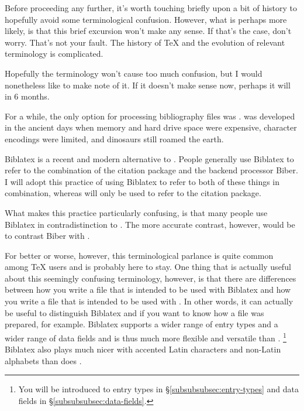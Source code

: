 \label{subsubsubsec:a-terminological-note}

Before proceeding any further, it's worth touching briefly upon a bit of history to hopefully avoid some terminological confusion.
However, what is perhaps more likely, is that this brief excursion won't make any sense.
If that's the case, don't worry.
That's not your fault.
The history of \TeX{} and the evolution of relevant terminology is complicated.

Hopefully the terminology won't cause too much confusion, but I would nonetheless like to make note of it.
If it doesn't make sense now, perhaps it will in 6 months.

For a while, the only option for processing bibliography files was .
 was developed in the ancient days when memory and hard drive space were expensive, character encodings were limited, and dinosaurs still roamed the earth.

Biblatex is a recent and modern alternative to .
People generally use Biblatex to refer to the combination of the citation package  and the backend processor Biber.
I will adopt this practice of using Biblatex to refer to both of these things in combination, whereas  will only be used to refer to the citation package.

What makes this practice particularly confusing, is that many people use Biblatex in contradistinction to .
The more accurate contrast, however, would be to contrast Biber with .

For better or worse, however, this terminological parlance is quite common among \TeX{} users and is probably here to stay.
One thing that is actually useful about this seemingly confusing terminology, however, is that there are differences between how you write a  file that is intended to be used with Biblatex and how you write a  file that is intended to be used with .
In other words, it can actually be useful to distinguish Biblatex and  if you want to know how a  file was prepared, for example.
Biblatex supports a wider range of entry types and a wider range of data fields and is thus much more flexible and versatile than .%
\footnote{%
You will be introduced to entry types in \S\ref{subsubsubsec:entry-types} and data fields in \S\ref{subsubsubsec:data-fields}.%
}
Biblatex also plays much nicer with accented Latin characters and non-Latin alphabets than does .

